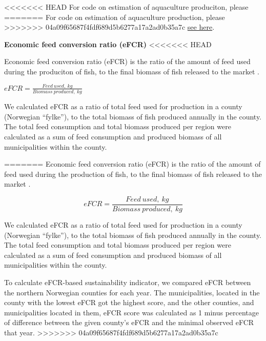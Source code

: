 \documentclass[
]{book}
\begin{document}
\textless\textless\textless\textless\textless\textless\textless{} HEAD
For code on estimation of aquaculture produciton, please
=======
For code on estimation of aquaculture production, please
\textgreater\textgreater\textgreater\textgreater\textgreater\textgreater\textgreater{} 04a09f65687f4fdf689d5b6277a17a2ad0b35a7c
\href{https://ohi-norway.github.io/nor-prep/prep/food_provision/Mariculture/total_aquaculture_production_and_efcr_newdata_jan2020.html}{see here}.

\textbf{Economic feed conversion ratio (eFCR)}
\textless\textless\textless\textless\textless\textless\textless{} HEAD

Economic feed conversion ratio (eFCR) is the ratio of the amount of feed used during the produciton of fish, to the final biomass of fish released to the market \citep{boyd2007indicators}.

\(eFCR = \frac{Feed \ used,\ kg}{Biomass\ produced,\ kg}\)

We calculated eFCR as a ratio of total feed used for production in a county (Norwegian ``fylke''), to the total biomass of fish produced annually in the county. The total feed consumption and total biomass produced per region were calculated as a sum of feed consumption and produced biomass of all municipalities within the county.

=======
Economic feed conversion ratio (eFCR) is the ratio of the amount of feed used during the production of fish, to the final biomass of fish released to the market \citep{boyd2007indicators}.

\begin{equation}
eFCR = \frac{Feed \ used,\ kg}{Biomass\ produced,\ kg}
 \label{eq:efcr}
\end{equation}

We calculated eFCR as a ratio of total feed used for production in a county (Norwegian ``fylke''), to the total biomass of fish produced annually in the county. The total feed consumption and total biomass produced per region were calculated as a sum of feed consumption and produced biomass of all municipalities within the county.

To calculate eFCR-based sustainability indicator, we compared eFCR between the northern Norwegian counties for each year. The municipalities, located in the county with the lowest eFCR got the highest score, and the other counties, and municipalities located in them, eFCR score was calculated as 1 minus percentage of difference between the given county's eFCR and the minimal observed eFCR that year.
\textgreater\textgreater\textgreater\textgreater\textgreater\textgreater\textgreater{} 04a09f65687f4fdf689d5b6277a17a2ad0b35a7c
\end{document}
